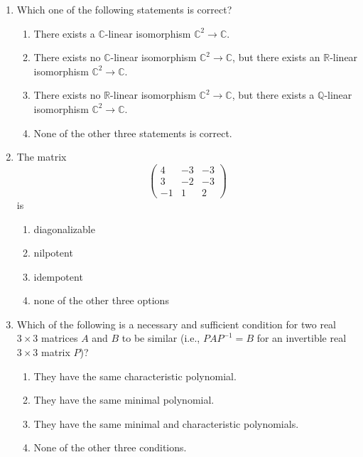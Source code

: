 \documentclass[11pt, a4paper]{article}
\begin{document}
\begin{enumerate}
  \item Which one of the following statements is correct?
  \begin{enumerate}[label=(\alph*)]
    \item There exists a $\mathbb{C}$-linear isomorphism $\mathbb{C}^2 \to \mathbb{C}$.
    \item There exists no $\mathbb{C}$-linear isomorphism $\mathbb{C}^2 \to \mathbb{C}$, but there exists an $\mathbb{R}$-linear isomorphism $\mathbb{C}^2 \to \mathbb{C}$.
    \item There exists no $\mathbb{R}$-linear isomorphism $\mathbb{C}^2 \to \mathbb{C}$, but there exists a $\mathbb{Q}$-linear isomorphism $\mathbb{C}^2 \to \mathbb{C}$.
    \item None of the other three statements is correct.
  \end{enumerate}

  \item The matrix
  \[
    \begin{pmatrix}
      4 & -3 & -3 \\
      3 & -2 & -3 \\
      -1 & 1 & 2
    \end{pmatrix}
  \]
  is
  \begin{enumerate}[label=(\alph*)]
    \item diagonalizable
    \item nilpotent
    \item idempotent
    \item none of the other three options
  \end{enumerate}

  \item Which of the following is a necessary and sufficient condition for two real $3 \times 3$ matrices $A$ and $B$ to be similar (i.e., $PAP^{-1} = B$ for an invertible real $3 \times 3$ matrix $P$)?
  \begin{enumerate}[label=(\alph*)]
    \item They have the same characteristic polynomial.
    \item They have the same minimal polynomial.
    \item They have the same minimal and characteristic polynomials.
    \item None of the other three conditions.
  \end{enumerate}


\end{enumerate}
\end{document}
